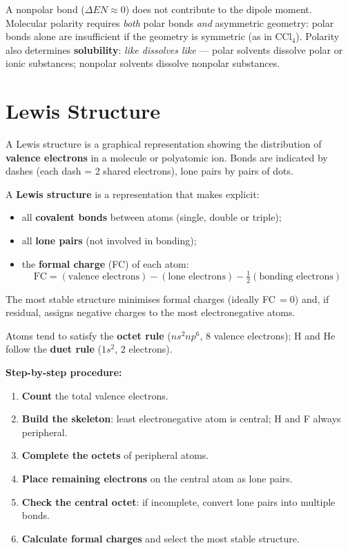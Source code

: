\documentclass[a4paper,11pt]{article}
\begin{document}
\begin{attenzione}
A nonpolar bond ($\Delta EN \approx 0$) does not contribute to the dipole moment. Molecular polarity requires \emph{both} polar bonds \emph{and} asymmetric geometry: polar bonds alone are insufficient if the geometry is symmetric (as in CCl$_4$). Polarity also determines \textbf{solubility}: \textit{like dissolves like} --- polar solvents dissolve polar or ionic substances; nonpolar solvents dissolve nonpolar substances.
\end{attenzione}

\clearpage

\section{Lewis Structure}

A Lewis structure is a graphical representation showing the distribution of \textbf{valence electrons} in a molecule or polyatomic ion. Bonds are indicated by dashes (each dash = 2 shared electrons), lone pairs by pairs of dots.

\begin{definizione}
A \textbf{Lewis structure} is a representation that makes explicit:
\begin{itemize}
  \item all \textbf{covalent bonds} between atoms (single, double or triple);
  \item all \textbf{lone pairs} (not involved in bonding);
  \item the \textbf{formal charge} (FC) of each atom:
  \[
    \text{FC} = (\text{valence electrons}) - (\text{lone electrons}) - \tfrac{1}{2}(\text{bonding electrons})
  \]
\end{itemize}
The most stable structure minimises formal charges (ideally FC\,$= 0$) and, if residual, assigns negative charges to the most electronegative atoms.
\end{definizione}

\noindent Atoms tend to satisfy the \textbf{octet rule} ($ns^2np^6$, 8 valence electrons); H and He follow the \textbf{duet rule} ($1s^2$, 2 electrons).

\vspace{6pt}
\textbf{Step-by-step procedure:}
\begin{enumerate}
  \item \textbf{Count} the total valence electrons.
  \item \textbf{Build the skeleton}: least electronegative atom is central; H and F always peripheral.
  \item \textbf{Complete the octets} of peripheral atoms.
  \item \textbf{Place remaining electrons} on the central atom as lone pairs.
  \item \textbf{Check the central octet}: if incomplete, convert lone pairs into multiple bonds.
  \item \textbf{Calculate formal charges} and select the most stable structure.
\end{enumerate}
\end{document}
